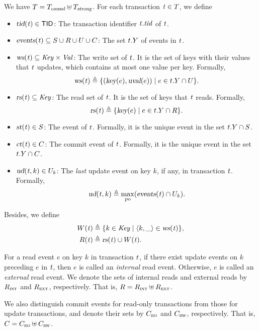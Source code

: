 We have $T = T_{\textsl{causal}} \uplus T_{\textsl{strong}}$.
For each transaction $\mathit{t} \in T$, we define
\begin{itemize}
  \item $\textsl{tid}(\mathit{t}) \in {\sf TID}$:
    The transaction identifier $t.\mathit{tid}$ of $\mathit{t}$.
  \item $\textsl{events}(\mathit{t}) \subseteq S \cup R \cup U \cup C$:
    The set $t.Y$ of events in $\mathit{t}$.
  \item $\textsl{ws}(\mathit{t}) \subseteq \mathit{Key} \times \mathit{Val}$:
    The write set of $\mathit{t}$.
    It is the set of keys with their values that $\mathit{t}$ updates,
    which contains at most one value per key.
    Formally,
    \[
      \textsl{ws}(\mathit{t}) \triangleq \{(\textsl{key}(e), \textsl{uval}(e)) \mid e \in t.Y \cap U\}.
    \]
  \item $\textsl{rs}(\mathit{t}) \subseteq \mathit{Key}$: The read set of $\mathit{t}$.
    It is the set of keys that $\mathit{t}$ reads.
    Formally,
    \[
      \textsl{rs}(\mathit{t}) \triangleq \{\textsl{key}(e) \mid e \in t.Y \cap R\}.
    \]
  \item $\textsl{st}(\mathit{t}) \in S$:
    The \start{} event of $\mathit{t}$.
    Formally, it is the unique event in the set $t.Y \cap S$.
  \item $\textsl{ct}(\mathit{t}) \in C$: The commit event of $\mathit{t}$.
    Formally, it is the unique event in the set $t.Y \cap C$.
  \item $\textsl{ud}(\mathit{t}, k) \in U_{k}$: The \emph{last} update event on key $k$, if any,
    in transaction $\mathit{t}$. Formally,
    \[
      \textsl{ud}(\mathit{t}, k) \triangleq \max\limits_{\textsl{po}}(\textsl{events}(\mathit{t}) \cap U_{k}).
    \]
\end{itemize}

Besides, we define
\begin{align}
  W(\mathit{t}) &\triangleq \{k \in \mathit{Key} \mid \langle k, \_ \rangle \in \textsl{ws}(\mathit{t})\}, \label{eq:W-def}\\
  R(\mathit{t}) &\triangleq \textsl{rs}(\mathit{t}) \cup W(\mathit{t}).\label{eq:R-def}
\end{align}

For a read event $e$ on key $k$ in transaction $\mathit{t}$,
if there exist update events on $k$ preceding $e$ in $\mathit{t}$,
then $e$ is called an \emph{internal} read event.
Otherwise, $e$ is called an \emph{external} read event.
We denote the sets of internal reads and external reads
by $R_{\textsc{int}}$ and $R_{\textsc{ext}}$, respectively.
That is, $R = R_{\textsc{int}} \uplus R_{\textsc{ext}}$.

We also distinguish commit events
for read-only transactions from those for update transactions,
and denote their sets by $C_{\textsc{ro}}$ and $C_{\textsc{rw}}$, respectively.
That is, $C = C_{\textsc{ro}} \uplus C_{\textsc{rw}}$.

